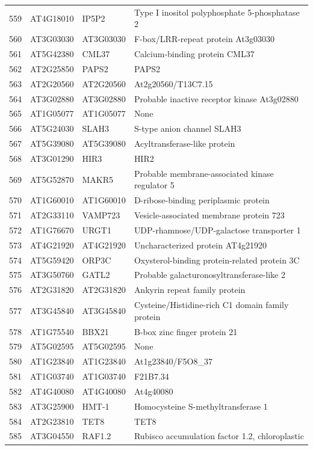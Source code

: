 \documentclass[11pt]{article}
\begin{document}
\begin{center}
\begin{tabular}{rlll}
559 & AT4G18010 & IP5P2 & Type I inositol polyphosphate 5-phosphatase 2\\
560 & AT3G03030 & AT3G03030 & F-box/LRR-repeat protein At3g03030\\
561 & AT5G42380 & CML37 & Calcium-binding protein CML37\\
562 & AT2G25850 & PAPS2 & PAPS2\\
563 & AT2G20560 & AT2G20560 & At2g20560/T13C7.15\\
564 & AT3G02880 & AT3G02880 & Probable inactive receptor kinase At3g02880\\
565 & AT1G05077 & AT1G05077 & None\\
566 & AT5G24030 & SLAH3 & S-type anion channel SLAH3\\
567 & AT5G39080 & AT5G39080 & Acyltransferase-like protein\\
568 & AT3G01290 & HIR3 & HIR2\\
569 & AT5G52870 & MAKR5 & Probable membrane-associated kinase regulator 5\\
570 & AT1G60010 & AT1G60010 & D-ribose-binding periplasmic protein\\
571 & AT2G33110 & VAMP723 & Vesicle-associated membrane protein 723\\
572 & AT1G76670 & URGT1 & UDP-rhamnose/UDP-galactose transporter 1\\
573 & AT4G21920 & AT4G21920 & Uncharacterized protein AT4g21920\\
574 & AT5G59420 & ORP3C & Oxysterol-binding protein-related protein 3C\\
575 & AT3G50760 & GATL2 & Probable galacturonosyltransferase-like 2\\
576 & AT2G31820 & AT2G31820 & Ankyrin repeat family protein\\
577 & AT3G45840 & AT3G45840 & Cysteine/Histidine-rich C1 domain family protein\\
578 & AT1G75540 & BBX21 & B-box zinc finger protein 21\\
579 & AT5G02595 & AT5G02595 & None\\
580 & AT1G23840 & AT1G23840 & At1g23840/F5O8\_37\\
581 & AT1G03740 & AT1G03740 & F21B7.34\\
582 & AT4G40080 & AT4G40080 & At4g40080\\
583 & AT3G25900 & HMT-1 & Homocysteine S-methyltransferase 1\\
584 & AT2G23810 & TET8 & TET8\\
585 & AT3G04550 & RAF1.2 & Rubisco accumulation factor 1.2, chloroplastic\\

\end{tabular}
\end{center}
\end{document}
